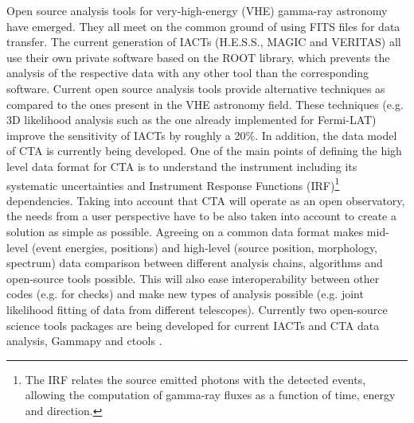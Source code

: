 Open source analysis tools for very-high-energy (VHE) gamma-ray astronomy have emerged. They all meet on the common ground of using FITS files for data transfer. The current generation of IACTs (H.E.S.S., MAGIC and VERITAS) all use their own private software based on the ROOT library, which prevents the analysis of the respective data with any other tool than the corresponding software. Current open source analysis tools provide alternative techniques as compared to the ones present in the VHE astronomy field. These techniques (e.g. 3D likelihood analysis such as the one already implemented for Fermi-LAT) improve the sensitivity of IACTs by roughly a 20\%. In addition, the data model of CTA is currently being developed. One of the main points of defining the high level data format for CTA is to understand the instrument including its systematic uncertainties and Instrument Response Functions (IRF)\footnote{The IRF relates the source emitted photons with the detected events, allowing the computation of gamma-ray fluxes as a function of time, energy and direction.} dependencies. Taking into account that CTA will operate as an open observatory, the needs from a user perspective have to be also taken into account to create a solution as simple as possible. Agreeing on a common data format makes mid-level (event energies, positions) and high-level (source position, morphology, spectrum) data comparison between different analysis chains, algorithms and open-source tools possible. This will also ease interoperability between other codes (e.g. for checks) and make new types of analysis possible (e.g. joint likelihood fitting of data from different telescopes). Currently two open-source science tools packages are being developed for current IACTs and CTA data analysis, Gammapy \cite{2015arXiv150907408D} and ctools \cite{2016AnA...593A...1K}.


